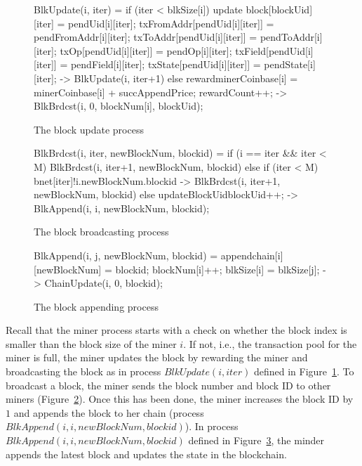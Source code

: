 \documentclass{KERauth}
\begin{document}
\begin{figure}[h]
\begin{center}
\begin{boxedverbatim}
BlkUpdate(i, iter) = 
  if (iter < blkSize[i]) {
    update{
      block[blockUid][iter] = pendUid[i][iter];
      txFromAddr[pendUid[i][iter]] = pendFromAddr[i][iter];
      txToAddr[pendUid[i][iter]] = pendToAddr[i][iter];
      txOp[pendUid[i][iter]] = pendOp[i][iter];
      txField[pendUid[i][iter]] = pendField[i][iter];
      txState[pendUid[i][iter]] = pendState[i][iter];} ->
    BlkUpdate(i, iter+1)} 
  else {reward{minerCoinbase[i] = minerCoinbase[i] + 
        succAppendPrice; rewardCount++;} ->
  BlkBrdcst(i, 0, blockNum[i], blockUid)};
\end{boxedverbatim}
\end{center}
\caption{The block update process}\label{fig:blkupdate}
\end{figure}


\begin{figure}[h]
\begin{center}
\begin{boxedverbatim}
BlkBrdcst(i, iter, newBlockNum, blockid) =
  if (i == iter && iter < M) {BlkBrdcst(i, iter+1, newBlockNum, blockid)} 
  else if (iter < M) {
    bnet[iter]!i.newBlockNum.blockid ->
    BlkBrdcst(i, iter+1, newBlockNum, blockid)} 
  else {
    updateBlockUid{blockUid++;} ->
    BlkAppend(i, i, newBlockNum, blockid)};
\end{boxedverbatim}
\end{center}
\caption{The block broadcasting process}\label{fig:blkbcast}
\end{figure}

\begin{figure}[h]
\begin{center}
\begin{boxedverbatim}
BlkAppend(i, j, newBlockNum, blockid) = 
  append{chain[i][newBlockNum] = blockid;
         blockNum[i]++;
         blkSize[i] = blkSize[j];} ->
  ChainUpdate(i, 0, blockid);
\end{boxedverbatim}
\end{center}
\caption{The block appending process}\label{fig:blkappend}
\end{figure}


Recall that the miner process starts with a check on whether the block index is smaller than the block size of the miner $i$. If not, i.e., the transaction pool for the miner is full, the miner updates the block by rewarding the miner and broadcasting the block as in process $BlkUpdate(i, iter)$ defined in Figure~\ref{fig:blkupdate}. 
To broadcast a block, the miner sends the block number and block ID to other miners (Figure~\ref{fig:blkbcast}). Once this has been done, the miner increases the block ID by $1$ and appends the block to her chain (process $BlkAppend(i, i, newBlockNum, blockid)$). 
In process $BlkAppend(i, i, newBlockNum, blockid)$ defined in Figure~\ref{fig:blkappend}, the minder appends the latest block and updates the state in the blockchain.
\end{document}
